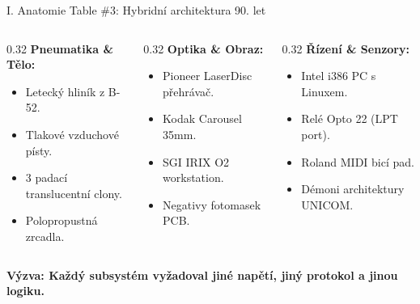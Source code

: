 \documentclass[aspectratio=169,11pt]{beamer}
\begin{document}
\begin{frame}{I. Anatomie Table \#3: Hybridní architektura 90. let}
  \begin{columns}
    \begin{column}{0.32\textwidth}
      \textbf{Pneumatika \& Tělo:}
      \begin{itemize}
        \item Letecký hliník z B-52.
        \item Tlakové vzduchové písty.
        \item 3 padací translucentní clony.
        \item Polopropustná zrcadla.
      \end{itemize}
    \end{column}
    \begin{column}{0.32\textwidth}
      \textbf{Optika \& Obraz:}
      \begin{itemize}
        \item Pioneer LaserDisc přehrávač.
        \item Kodak Carousel 35mm.
        \item SGI IRIX O2 workstation.
        \item Negativy fotomasek PCB.
      \end{itemize}
    \end{column}
    \begin{column}{0.32\textwidth}
      \textbf{Řízení \& Senzory:}
      \begin{itemize}
        \item Intel i386 PC s Linuxem.
        \item Relé Opto 22 (LPT port).
        \item Roland MIDI bicí pad.
        \item Démoni architektury UNICOM.
      \end{itemize}
    \end{column}
  \end{columns}
  \vspace{0.4cm}
  \centering\textcolor{vasulkaamber}{\textbf{Výzva: Každý subsystém vyžadoval jiné napětí, jiný protokol a jinou logiku.}}
\end{frame}
\end{document}

